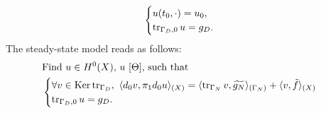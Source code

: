 \begin{discussion}
\begin{equation}
\begin{split}
\begin{cases}
        u(t_0, \cdot) = u_0, \\
        \mathop{\rm tr}\nolimits_{\Gamma_D, 0} u = g_D.
      \end{cases}
    \end{split}
  \end{equation}
  The steady-state model reads as follows:
  \begin{equation}
    \begin{split}
      & \text{Find $u \in H^0(X)$, $u\ [\Theta]$, such that} \\
      &
      \begin{cases}
        \forall v \in \mathop{\rm Ker}\nolimits \mathop{\rm tr}\nolimits_{\Gamma_D},\
          \langle d_0 v,\pi_1 d_0 u\rangle_{(X)}
          = \langle\mathop{\rm tr}\nolimits_{\Gamma_N} v,\widetilde{g_N}\rangle_{(\Gamma_N)}
          + \langle v,\tilde{f}\rangle_{(X)} \\
        \mathop{\rm tr}\nolimits_{\Gamma_D, 0} u = g_D.
      \end{cases}
    \end{split}
  \end{equation}
\end{discussion}
